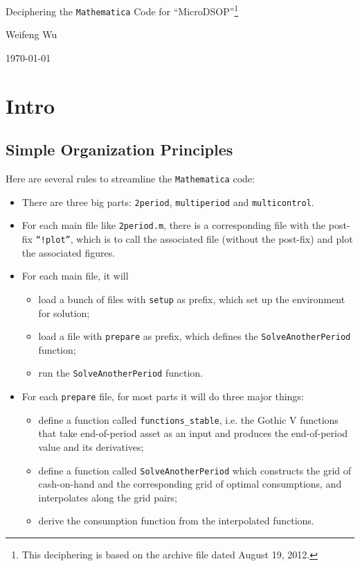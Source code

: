 \documentclass[titlepage,abstract]{\econtex}
\begin{document}
\centerline{{\Large Deciphering the \texttt{Mathematica} Code for ``MicroDSOP''\footnote{This deciphering is based on the archive file dated August 19, 2012.}}}
\centerline{Weifeng Wu}
\centerline{\today}
\medskip
\tableofcontents
\newpage

\section{Intro}
\subsection{Simple Organization Principles}
Here are several rules to streamline the \texttt{Mathematica} code:
\begin{itemize}
\item There are three big parts: \texttt{2period}, \texttt{multiperiod} and \texttt{multicontrol}.
\item For each main file like \texttt{2period.m}, there is a corresponding file with the post-fix \texttt{``!plot''}, which is to call the associated file (without the post-fix) and plot the associated figures.
\item For each main file, it will
\begin{itemize}
\item load a bunch of files with \texttt{setup} as prefix, which set up the environment for solution;
\item load a file with \texttt{prepare} as prefix, which defines the \texttt{SolveAnotherPeriod} function;
\item run the \texttt{SolveAnotherPeriod} function.
\end{itemize}

\item For each \texttt{prepare} file, for most parts it will do three major things:
\begin{itemize}
\item define a function called \texttt{functions\_stable}, i.e. the Gothic V functions that take end-of-period asset as an input and produces the end-of-period value and its derivatives;
\item define a function called \texttt{SolveAnotherPeriod} which constructs the grid of cash-on-hand and the corresponding grid of optimal consumptions, and interpolates along the grid pairs;
\item derive the consumption function from the interpolated functions.
\end{itemize}
\end{itemize}
\end{document}
